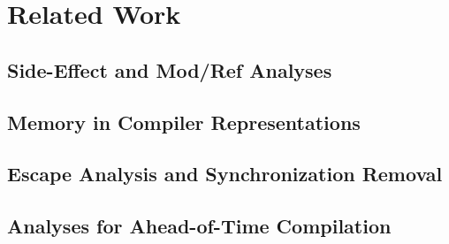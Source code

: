 \chapter{Related Work}\label{chap:related}

\section{Side-Effect and Mod/Ref Analyses}\label{sec:related-modref}

\section{Memory in Compiler Representations}\label{sec:related-memory}

\section{Escape Analysis and Synchronization Removal}\label{sec:related-escape}

\section{Analyses for Ahead-of-Time Compilation}\label{sec:related-aot}
